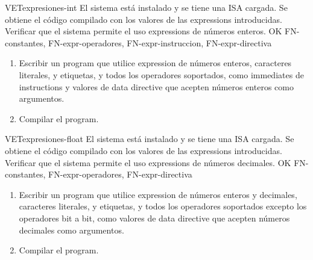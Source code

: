 \begin{testCase}{VET}{expresiones-int}
    {El sistema está instalado y se tiene una \gls{ISA} cargada.} %
    {Se obtiene el código compilado con los valores de las \glspl{expression} introducidas.} %
    {Verificar que el sistema permite el uso \glspl{expression} de números enteros.} %
    {OK} %
    {FN-constantes, FN-expr-operadores, FN-expr-instruccion, FN-expr-directiva} %
    \begin{enumerate}[leftmargin=*, topsep=0pt, noitemsep] %
        \item Escribir un \gls{program} que utilice \gls{expression} de números
        enteros, caracteres literales, y etiquetas, y todos los operadores
        soportados, como \glspl{immediate} de \glspl{instruction} y valores de
        \gls{data directive} que acepten números enteros como argumentos.
        \item Compilar el \gls{program}.
    \end{enumerate}
\end{testCase}

\begin{testCase}{VET}{expresiones-float}
    {El sistema está instalado y se tiene una \gls{ISA} cargada.} %
    {Se obtiene el código compilado con los valores de las \glspl{expression} introducidas.} %
    {Verificar que el sistema permite el uso \glspl{expression} de números decimales.} %
    {OK} %
    {FN-constantes, FN-expr-operadores, FN-expr-directiva} %
    \begin{enumerate}[leftmargin=*, topsep=0pt, noitemsep] %
        \item Escribir un \gls{program} que utilice \gls{expression} de números
        enteros y decimales, caracteres literales, y etiquetas, y todos los
        operadores soportados excepto los operadores bit a bit, como valores de
        \gls{data directive} que acepten números decimales como argumentos.
        \item Compilar el \gls{program}.
    \end{enumerate}
\end{testCase}


